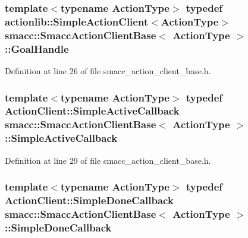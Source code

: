 \subsubsection[{\texorpdfstring{Goal\+Handle}{GoalHandle}}]{\setlength{\rightskip}{0pt plus 5cm}template$<$typename Action\+Type$>$ typedef actionlib\+::\+Simple\+Action\+Client$<$Action\+Type$>$ {\bf smacc\+::\+Smacc\+Action\+Client\+Base}$<$ Action\+Type $>$\+::{\bf Goal\+Handle}}\hypertarget{classsmacc_1_1SmaccActionClientBase_a70384df77a0bbf416475e730960a77cf}{}\label{classsmacc_1_1SmaccActionClientBase_a70384df77a0bbf416475e730960a77cf}


Definition at line 26 of file smacc\+\_\+action\+\_\+client\+\_\+base.\+h.

\subsubsection[{\texorpdfstring{Simple\+Active\+Callback}{SimpleActiveCallback}}]{\setlength{\rightskip}{0pt plus 5cm}template$<$typename Action\+Type$>$ typedef Action\+Client\+::\+Simple\+Active\+Callback {\bf smacc\+::\+Smacc\+Action\+Client\+Base}$<$ Action\+Type $>$\+::{\bf Simple\+Active\+Callback}}\hypertarget{classsmacc_1_1SmaccActionClientBase_ab99def4cdf0522abaf5a3bf7a444cfcb}{}\label{classsmacc_1_1SmaccActionClientBase_ab99def4cdf0522abaf5a3bf7a444cfcb}


Definition at line 29 of file smacc\+\_\+action\+\_\+client\+\_\+base.\+h.

\subsubsection[{\texorpdfstring{Simple\+Done\+Callback}{SimpleDoneCallback}}]{\setlength{\rightskip}{0pt plus 5cm}template$<$typename Action\+Type$>$ typedef Action\+Client\+::\+Simple\+Done\+Callback {\bf smacc\+::\+Smacc\+Action\+Client\+Base}$<$ Action\+Type $>$\+::{\bf Simple\+Done\+Callback}}\hypertarget{classsmacc_1_1SmaccActionClientBase_a185a419026fcdbec9ddf4703a1505524}{}\label{classsmacc_1_1SmaccActionClientBase_a185a419026fcdbec9ddf4703a1505524}


